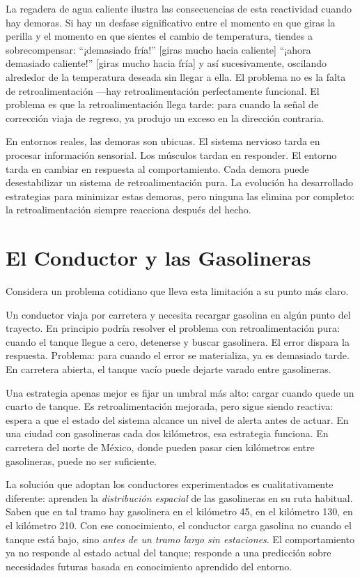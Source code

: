 \documentclass[
  letterpaper,
  DIV=11,
  numbers=noendperiod]{scrreprt}
\begin{document}
\begin{tcolorbox}[enhanced jigsaw, toprule=.15mm, arc=.35mm, colback=white, opacityback=0, colframe=quarto-callout-note-color-frame, breakable, rightrule=.15mm, left=2mm, leftrule=.75mm, bottomrule=.15mm]
La regadera de agua caliente ilustra las consecuencias de esta
reactividad cuando hay demoras. Si hay un desfase significativo entre el
momento en que giras la perilla y el momento en que sientes el cambio de
temperatura, tiendes a sobrecompensar: ``¡demasiado fría!'' {[}giras
mucho hacia caliente{]} ``¡ahora demasiado caliente!'' {[}giras mucho
hacia fría{]} y así sucesivamente, oscilando alrededor de la temperatura
deseada sin llegar a ella. El problema no es la falta de
retroalimentación ---hay retroalimentación perfectamente funcional. El
problema es que la retroalimentación llega tarde: para cuando la señal
de corrección viaja de regreso, ya produjo un exceso en la dirección
contraria.

En entornos reales, las demoras son ubicuas. El sistema nervioso tarda
en procesar información sensorial. Los músculos tardan en responder. El
entorno tarda en cambiar en respuesta al comportamiento. Cada demora
puede desestabilizar un sistema de retroalimentación pura. La evolución
ha desarrollado estrategias para minimizar estas demoras, pero ninguna
las elimina por completo: la retroalimentación siempre reacciona después
del hecho.

\section{El Conductor y las
Gasolineras}\label{el-conductor-y-las-gasolineras}

Considera un problema cotidiano que lleva esta limitación a su punto más
claro.

Un conductor viaja por carretera y necesita recargar gasolina en algún
punto del trayecto. En principio podría resolver el problema con
retroalimentación pura: cuando el tanque llegue a cero, detenerse y
buscar gasolinera. El error dispara la respuesta. Problema: para cuando
el error se materializa, ya es demasiado tarde. En carretera abierta, el
tanque vacío puede dejarte varado entre gasolineras.

Una estrategia apenas mejor es fijar un umbral más alto: cargar cuando
quede un cuarto de tanque. Es retroalimentación mejorada, pero sigue
siendo reactiva: espera a que el estado del sistema alcance un nivel de
alerta antes de actuar. En una ciudad con gasolineras cada dos
kilómetros, esa estrategia funciona. En carretera del norte de México,
donde pueden pasar cien kilómetros entre gasolineras, puede no ser
suficiente.

La solución que adoptan los conductores experimentados es
cualitativamente diferente: aprenden la \emph{distribución espacial} de
las gasolineras en su ruta habitual. Saben que en tal tramo hay
gasolinera en el kilómetro 45, en el kilómetro 130, en el kilómetro 210.
Con ese conocimiento, el conductor carga gasolina no cuando el tanque
está bajo, sino \emph{antes de un tramo largo sin estaciones}. El
comportamiento ya no responde al estado actual del tanque; responde a
una predicción sobre necesidades futuras basada en conocimiento
aprendido del entorno.


\end{tcolorbox}
\end{document}
